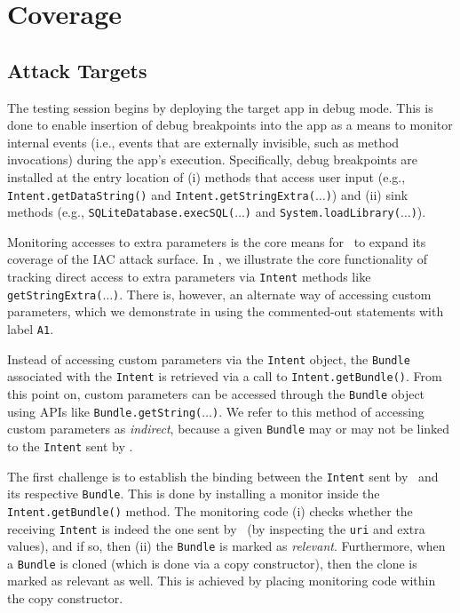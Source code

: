 \section{Coverage}

\subsection{Attack Targets}

The testing session begins by deploying the target app in debug mode. This is done to enable insertion of debug breakpoints into the app as a means to monitor internal events (i.e., events that are externally invisible, such as method invocations) during the app's execution. Specifically, debug breakpoints are installed at the entry location of (i) methods that access user input (e.g., {\tt Intent.getDataString()} and {\tt Intent.getStringExtra($\ldots$)}) and (ii) sink methods (e.g., {\tt SQLiteDatabase.execSQL($\ldots$)} and {\tt System.loadLibrary($\ldots$)}).

Monitoring accesses to extra parameters is the core means for \Tool\ to expand its coverage of the IAC attack surface. In , we illustrate the core functionality of tracking direct access to extra parameters via {\tt Intent} methods like {\tt getStringExtra($\ldots$)}. There is, however, an alternate way of accessing custom parameters, which we demonstrate in  using the commented-out statements with label {\tt A1}.

Instead of accessing custom parameters via the {\tt Intent} object, the {\tt Bundle} associated with the {\tt Intent} is retrieved via a call to {\tt Intent.getBundle()}. From this point on, custom parameters can be accessed through the {\tt Bundle} object using APIs like {\tt Bundle.getString($\ldots$)}. We refer to this method of accessing custom parameters as \emph{indirect}, because a given {\tt Bundle} may or may not be linked to the {\tt Intent} sent by \Tool.

The first challenge is to establish the binding between the {\tt Intent} sent by \Tool\ and its respective {\tt Bundle}. This is done by installing a monitor inside the {\tt Intent.getBundle()} method. The monitoring code (i) checks whether the receiving {\tt Intent} is indeed the one sent by \Tool\ (by inspecting the {\tt uri} and extra values), and if so, then (ii) the {\tt Bundle} is marked as \emph{relevant}. Furthermore, when a {\tt Bundle} is cloned (which is done via a copy constructor), then the clone is marked as relevant as well. This is achieved by placing monitoring code within the copy constructor.

